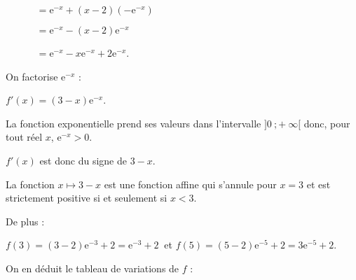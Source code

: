 \begin{corrige}
\begin{enumerate}
          \par
          $\phantom{f'(x)}= \text{e}^{-x}+(x-2)(-\text{e}^{-x})$
          \par
          $\phantom{f'(x)}= \text{e}^{-x}-(x-2)\text{e}^{-x}$
          \par
          $\phantom{f'(x)}= \text{e}^{-x}-x\text{e}^{-x} + 2\text{e}^{-x}$.
          \par
          On factorise $\text{e}^{-x}$ :
          \par
          $f'(x)=(3-x)\text{e}^{-x}$.
          \par
          \par
          La fonction exponentielle prend ses valeurs dans l'intervalle $]0~;+~\infty[$ donc, pour tout réel $x$, ${\text{e}^{-x} > 0}$.
          \par
          $f'(x)$ est donc du signe de $3-x$.
          \par
          La fonction $x \longmapsto 3-x$ est une fonction affine qui s'annule pour $x=3$ et est strictement positive si et seulement si $x < 3$.
          \par
          De plus :
          \par
          $f(3)=(3-2)\text{e}^{-3}+2=\text{e}^{-3}+2\ $ et $f(5)=(5-2)\text{e}^{-5}+2=3\text{e}^{-5}+2$.
          \par
          On en déduit le tableau de variations de $f$ :
          \par
          \begin{center}
               \begin{extern}%
\end{extern}
\end{center}
\end{enumerate}
\end{corrige}
